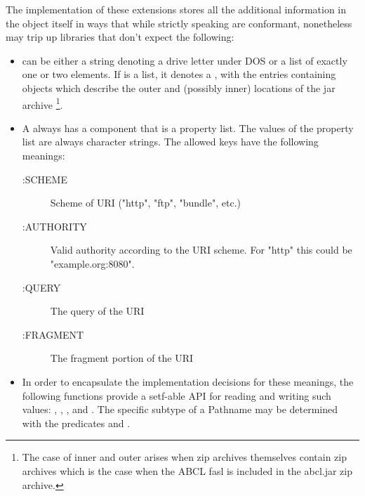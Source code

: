 \documentclass[10pt]{book}
\begin{document}
The implementation of these extensions stores all the additional
information in the  object itself in ways that while strictly
speaking are conformant, nonetheless may trip up libraries that don't
expect the following:

\begin{itemize}
\item {} can be either a string denoting a drive letter
  under \textsc{DOS} or a list of exactly one or two elements.  If
   is a list, it denotes a , with
  the entries containing  objects which describe the
  outer and (possibly inner) locations of the jar
  archive \footnote{The case of inner and outer
     arises when zip archives themselves
    contain zip archives which is the case when the ABCL fasl is
    included in the abcl.jar zip archive.}.

\item A  always has a  component that is a
  property list.  The values of the  property list are
  always character strings.  The allowed keys have the following meanings:
  \begin{description}
  \item[:SCHEME] Scheme of URI ("http", "ftp", "bundle", etc.)
  \item[:AUTHORITY] Valid authority according to the URI scheme.  For
    "http" this could be "example.org:8080". 
  \item[:QUERY] The query of the \textsc{URI} 
  \item[:FRAGMENT] The fragment portion of the \textsc{URI}
  \end{description}

\item In order to encapsulate the implementation decisions for these
  meanings, the following functions provide a setf-able API for
  reading and writing such values: ,
  , , and
  .  The specific subtype of a Pathname may
  be determined with the predicates  and
  .

\label{EXTENSIONS:URL-PATHNAME-SCHEME}

\label{EXTENSIONS:URL-PATHNAME-FRAGMENT}

\label{EXTENSIONS:URL-PATHNAME-AUTHORITY}

\label{EXTENSIONS:PATHNAME-URL-P}

\label{EXTENSIONS:URL-PATHNAME-QUERY}

\end{itemize}
\end{document}

